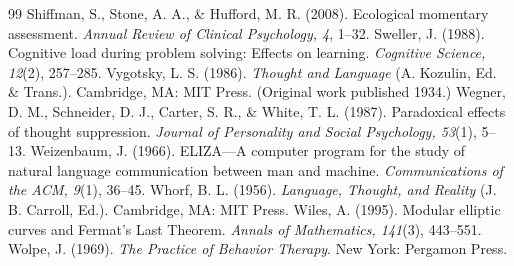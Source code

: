 \documentclass[11pt]{article}
\begin{document}
\begin{thebibliography}{99}
 Shiffman, S., Stone, A. A., \& Hufford, M. R. (2008). Ecological momentary assessment. \emph{Annual Review of Clinical Psychology, 4}, 1--32.
 Sweller, J. (1988). Cognitive load during problem solving: Effects on learning. \emph{Cognitive Science, 12}(2), 257--285.
 Vygotsky, L. S. (1986). \emph{Thought and Language} (A. Kozulin, Ed. \& Trans.). Cambridge, MA: MIT Press. (Original work published 1934.)
 Wegner, D. M., Schneider, D. J., Carter, S. R., \& White, T. L. (1987). Paradoxical effects of thought suppression. \emph{Journal of Personality and Social Psychology, 53}(1), 5--13.
 Weizenbaum, J. (1966). ELIZA---A computer program for the study of natural language communication between man and machine. \emph{Communications of the ACM, 9}(1), 36--45.
 Whorf, B. L. (1956). \emph{Language, Thought, and Reality} (J. B. Carroll, Ed.). Cambridge, MA: MIT Press.
 Wiles, A. (1995). Modular elliptic curves and Fermat's Last Theorem. \emph{Annals of Mathematics, 141}(3), 443--551.
 Wolpe, J. (1969). \emph{The Practice of Behavior Therapy}. New York: Pergamon Press.
\end{thebibliography}
\end{document}
